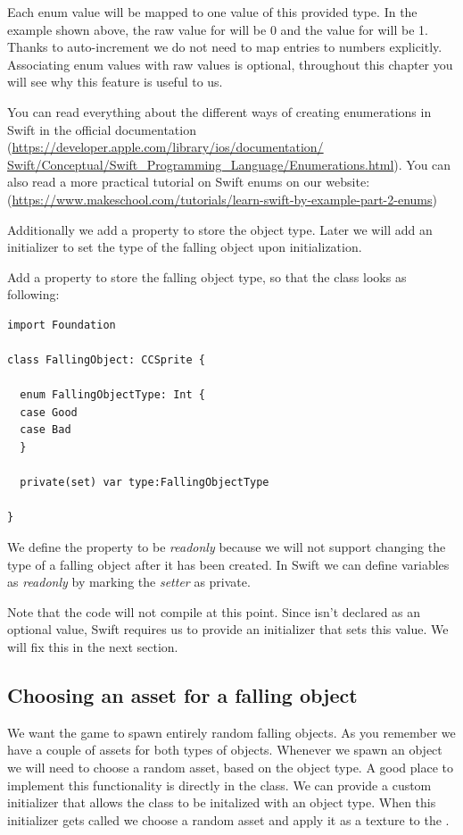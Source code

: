 Each enum value will be mapped to one value of this
provided type. In the example shown above, the raw value for
 will be 0 and the value for
 will be 1. Thanks to auto-increment we do not
need to map entries to numbers explicitly. Associating enum values with raw values is optional,
throughout this chapter you will see why this feature is useful to us.

\begin{details} 
You can read everything about the different ways of creating enumerations in
Swift in the official documentation
(\url{https://developer.apple.com/library/ios/documentation/
Swift/Conceptual/Swift_Programming_Language/Enumerations.html}).
You can also read a more practical tutorial on Swift enums on our website:
(\url{https://www.makeschool.com/tutorials/learn-swift-by-example-part-2-enums})
\end{details}

Additionally we add a property to store the object type. Later we will
add an initializer to set the type of the falling object upon initialization. 

\begin{leftbar}
Add a property to store the falling object type, so that the class looks as
following:
\begin{lstlisting}
import Foundation

class FallingObject: CCSprite {

  enum FallingObjectType: Int {
  case Good
  case Bad
  }
    
  private(set) var type:FallingObjectType
  
}
\end{lstlisting}
\end{leftbar}

We define the property to be \textit{readonly} because we will not
support changing the type of a falling object after it has been created. In Swift we can 
define variables as \textit{readonly} by marking the \textit{setter} as private.

Note that the code will not compile at this point. Since  isn't
declared as an optional value, Swift requires us to provide an initializer that
sets this value. We will fix this in the next section.

\subsection{Choosing an asset for a falling object}
We want the game to spawn entirely random falling objects. As you remember we
have a couple of assets for both types of objects. Whenever we spawn an object
we will need to choose a random asset, based on the object type. A good place to
implement this functionality is directly in the 
class. We can provide a custom initializer that allows the class to be initalized with an object type.
When this initializer gets called we choose a random asset and apply it as a
texture to the .

